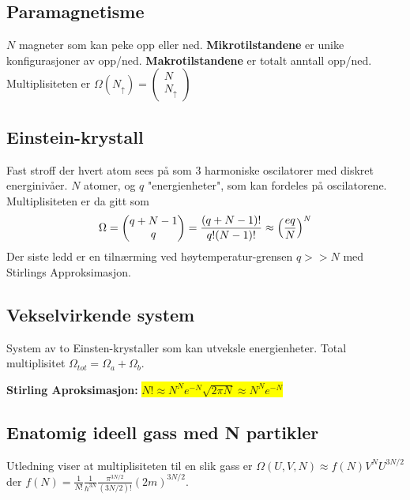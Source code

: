 \documentclass[10pt,a4paper]{article}
\renewcommand{\b}{\textbf}
\newcommand{\yl}{\colorbox{yellow}}
\begin{document}
\begin{multicols}{2}
\subsection*{Paramagnetisme}
\begin{framed}
$N$ magneter som kan peke opp eller ned. \b{Mikrotilstandene} er unike konfigurasjoner av opp/ned. \b{Makrotilstandene} er totalt anntall opp/ned. Multiplisiteten er $\Omega(N_{\uparrow}) = \begin{pmatrix}N\\N_\uparrow\end{pmatrix}$
\end{framed}
\newpage


\subsection*{Einstein-krystall}
\begin{framed}
Fast stroff der hvert atom sees på som 3 harmoniske oscilatorer med diskret energinivåer. $N$ atomer, og $q$ "energienheter", som kan fordeles på oscilatorene. Multiplisiteten er da gitt som
\begin{align*}
	\Omega = \begin{pmatrix} q+N-1\\ q \end{pmatrix}
	= \frac{(q+N-1)!}{q!(N-1)!} \approx \qty(\frac{eq}{N})^N
\end{align*}
Der siste ledd er en tilnærming ved høytemperatur-grensen $q >> N$ med Stirlings Approksimasjon.
\end{framed}

\subsection*{Vekselvirkende system}
\begin{framed}
System av to Einsten-krystaller som kan utveksle energienheter. Total multiplisitet $\Omega_{tot} = \Omega_a + \Omega_b$.
\end{framed}


\b{Stirling Aproksimasjon:} \yl{$N! \approx N^N e^{-N}\sqrt{2\pi N} \approx N^N e^{-N}$}


\subsection*{Enatomig ideell gass med N partikler}
\begin{framed}
Utledning viser at multiplisiteten til en slik gass er $\Omega(U,V,N) \approx f(N)V^N U^{3N/2}$ der $f(N)=\frac{1}{N!}\frac{1}{h^{3N}}\frac{\pi^{3N/2}}{(3N/2)!}(2m)^{3N/2}$.
\end{framed}



\end{multicols}
\end{document}
